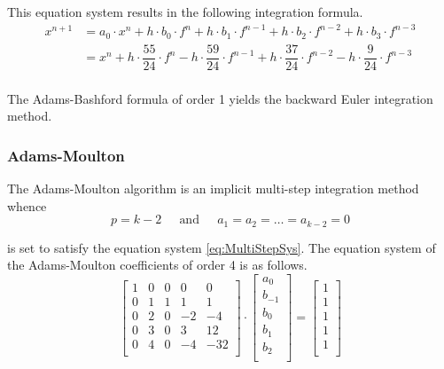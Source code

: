 This equation system results in the following integration formula.
\begin{equation}
\begin{split}
x^{n+1} &= a_0\cdot x^{n} + h\cdot b_{0}\cdot f^{n} + h\cdot b_{1}\cdot f^{n-1} + h\cdot b_{2}\cdot f^{n-2} + h\cdot b_{3}\cdot f^{n-3}\\
&= x^{n} + h\cdot \dfrac{55}{24}\cdot f^{n} - h\cdot \dfrac{59}{24}\cdot f^{n-1} + h\cdot \dfrac{37}{24}\cdot f^{n-2} - h\cdot \dfrac{9}{24}\cdot f^{n-3}\\
\end{split}
\end{equation}

The Adams-Bashford formula of order 1 yields the backward Euler
integration method.

\subsubsection{Adams-Moulton}

The Adams-Moulton algorithm is an implicit multi-step integration
method whence
\begin{equation}
p = k - 2
\;\;\;\; \textrm{ and } \;\;\;\;
a_1 = a_2 = \ldots = a_{k-2} = 0
\end{equation}

is set to satisfy the equation system \eqref{eq:MultiStepSys}.  The
equation system of the Adams-Moulton coefficients of order 4 is as
follows.
\begin{equation}
\left[\begin{array}{lrrrr}
1 & 0 &  0 &   0 &    0\\
0 & 1 &  1 &   1 &    1\\
0 & 2 &  0 &  -2 &   -4\\
0 & 3 &  0 &   3 &   12\\
0 & 4 &  0 &  -4 &  -32\\
\end{array}\right]
\cdot
\begin{bmatrix}
a_0\\
b_{-1}\\
b_0\\
b_1\\
b_2\\
\end{bmatrix}
=
\begin{bmatrix}
1\\
1\\
1\\
1\\
1\\
\end{bmatrix}
\end{equation}

